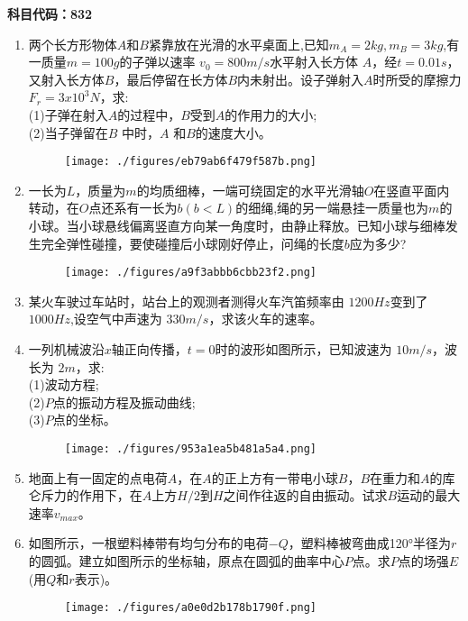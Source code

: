 \textbf{科目代码：832}
\begin{enumerate}
\item 两个长方形物体$A$和$B$紧靠放在光滑的水平桌面上,已知$m_A=2kg,m_B=3kg$,有一质量$ m=100g$的子弹以速率 $v_0=800m/s$水平射入长方体 $A$，经$t=0.01s$，又射入长方体$B$，最后停留在长方体$B$内未射出。设子弹射入$A$时所受的摩擦力$F_r=3x10^3N$，求:\\
(1)子弹在射入$A$的过程中，$B $受到$A$的作用力的大小;\\
(2)当子弹留在$ B$ 中时，$A$ 和$B$的速度大小。
\begin{figure}[ht]
\centering
\texttt{[image: ./figures/eb79ab6f479f587b.png]}
\caption{} \label{fig_SD11_3}
\end{figure}
\item 一长为$L$，质量为$m$的均质细棒，一端可绕固定的水平光滑轴$O$在竖直平面内转动，在$O$点还系有一长为$b(b<L)$的细绳,绳的另一端悬挂一质量也为$m$的小球。当小球悬线偏离竖直方向某一角度时，由静止释放。已知小球与细棒发生完全弹性碰撞，要使碰撞后小球刚好停止，问绳的长度$b$应为多少?
\begin{figure}[ht]
\centering
\texttt{[image: ./figures/a9f3abbb6cbb23f2.png]}
\caption{} \label{fig_SD11_4}
\end{figure}
\item 某火车驶过车站时，站台上的观测者测得火车汽笛频率由 $1200Hz$变到了 $1000 Hz$,设空气中声速为 $330m/s$，求该火车的速率。
\item 一列机械波沿$x$轴正向传播，$t=0$时的波形如图所示，已知波速为 $10m/s$，波长为 $2m$，求:\\
(1)波动方程;\\
(2)$P$点的振动方程及振动曲线;\\
(3)$P $点的坐标。
\begin{figure}[ht]
\centering
\texttt{[image: ./figures/953a1ea5b481a5a4.png]}
\caption{} \label{fig_SD11_5}
\end{figure}
\item 地面上有一固定的点电荷$ A$，在$A$的正上方有一带电小球$B$，$B$在重力和$A$的库仑斥力的作用下，在$A$上方$ H/2 $到$H$之间作往返的自由振动。试求$B$运动的最大速率$v_{max}$。
\item  如图所示，一根塑料棒带有均匀分布的电荷$-Q$，塑料棒被弯曲成120°半径为$r$的圆弧。建立如图所示的坐标轴，原点在圆弧的曲率中心$P$点。求$P$点的场强$E$(用$Q$和$r$表示)。
\begin{figure}[ht]
\centering
\texttt{[image: ./figures/a0e0d2b178b1790f.png]}

\end{figure}
\end{enumerate}
